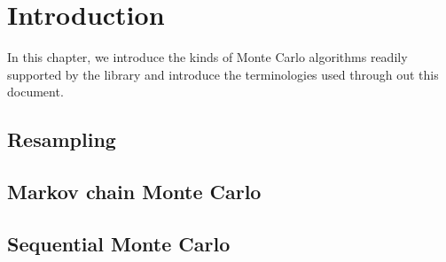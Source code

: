 \chapter{Introduction}
\label{chap:Introduction}

In this chapter, we introduce the kinds of Monte Carlo algorithms readily
supported by the library and introduce the terminologies used through out this
document.

\section{Resampling}

\section{Markov chain Monte Carlo}

\section{Sequential Monte Carlo}
